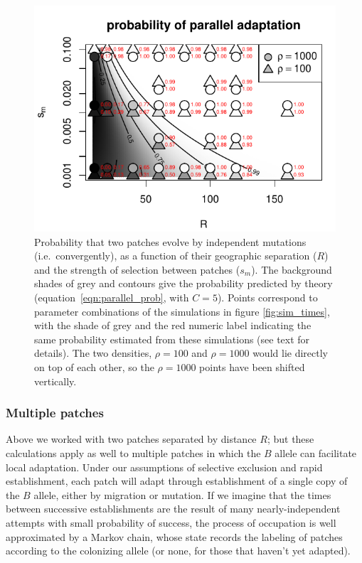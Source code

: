 \documentclass{article}
\begin{document}
\begin{figure}[ht!]
  \begin{center}
      \includegraphics{prob-mutation-compared}
  \end{center}
  \caption{
      Probability that two patches 
      evolve by independent mutations (i.e.\ convergently),
      as a function of their geographic separation ($R$)
      and the strength of selection between patches ($s_m$).
      The background shades of grey and contours
      give the probability predicted by theory (equation~\eqref{eqn:parallel_prob}, with $C=5$).
      Points correspond to parameter combinations of the simulations in figure \ref{fig:sim_times},
      with the shade of grey and the red numeric label indicating the same probability
      estimated from these simulations (see text for details).
      The two densities, $\rho=100$ and $\rho=1000$ would lie directly on top of each other, so the $\rho=1000$ points have been shifted vertically.
  }   \label{fig:sim_probs}
\end{figure}

\subsubsection{Multiple patches}
Above we worked with two patches separated by distance $R$;
but these calculations apply as well to multiple patches
in which the $B$ allele can facilitate local adaptation. 
Under our assumptions of selective exclusion and rapid establishment, 
each patch will adapt through establishment of a single copy of the $B$ allele, 
either by migration or mutation.
If we imagine that the times between successive establishments are the result of many nearly-independent attempts
with small probability of success,
the process of occupation is well approximated by a Markov chain,
whose state records the labeling of patches according to the colonizing allele
(or none, for those that haven't yet adapted).
\end{document}
